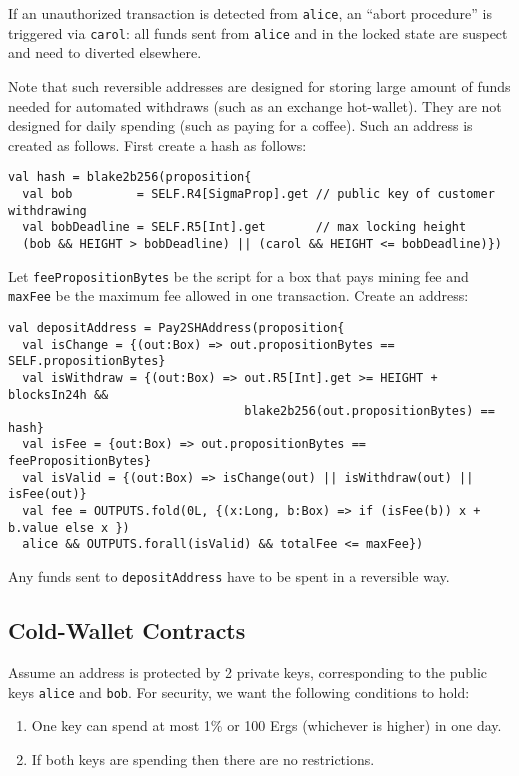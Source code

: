 \documentclass[11pt]{article}
\begin{document}
If an unauthorized transaction is detected from \texttt{alice}, an ``abort procedure'' is triggered via \texttt{carol}: all funds sent from \texttt{alice} and in the locked state are suspect and need to diverted elsewhere. %

Note that such reversible addresses are designed for storing large amount of funds needed for automated withdraws (such as an exchange hot-wallet). They are not designed for daily spending (such as paying for a coffee). 
Such an address is created as follows. First create a hash as follows:
\begin{verbatim}
val hash = blake2b256(proposition{
  val bob         = SELF.R4[SigmaProp].get // public key of customer withdrawing
  val bobDeadline = SELF.R5[Int].get       // max locking height
  (bob && HEIGHT > bobDeadline) || (carol && HEIGHT <= bobDeadline)})
\end{verbatim}

Let \texttt{feePropositionBytes} be the script for a box that pays mining fee and \texttt{maxFee} be the maximum fee allowed in one transaction. 
Create an address:
\begin{verbatim}
val depositAddress = Pay2SHAddress(proposition{
  val isChange = {(out:Box) => out.propositionBytes == SELF.propositionBytes}
  val isWithdraw = {(out:Box) => out.R5[Int].get >= HEIGHT + blocksIn24h &&
                                 blake2b256(out.propositionBytes) == hash}
  val isFee = {out:Box) => out.propositionBytes == feePropositionBytes}
  val isValid = {(out:Box) => isChange(out) || isWithdraw(out) || isFee(out)}
  val fee = OUTPUTS.fold(0L, {(x:Long, b:Box) => if (isFee(b)) x + b.value else x })
  alice && OUTPUTS.forall(isValid) && totalFee <= maxFee})
\end{verbatim}

Any funds sent to \texttt{depositAddress} have to be spent in a reversible way. 

\subsection{Cold-Wallet Contracts}

Assume an address is protected by 2 private keys, corresponding to the public keys \texttt{alice} and \texttt{bob}. For security, we want the following conditions to hold:

\begin{enumerate}
	\item One key can spend at most 1\% or 100 Ergs (whichever is higher) in one day.
	\item If both keys are spending then there are no restrictions. 
\end{enumerate}
\end{document}
